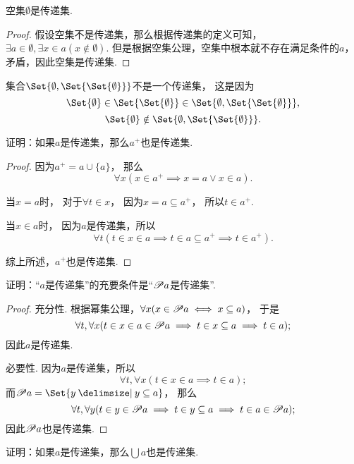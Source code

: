 \begin{example}
空集\(\emptyset\)是传递集.
\begin{proof}
假设空集不是传递集，那么根据传递集的定义可知，\(\exists a \in \emptyset, \exists x \in a (x \notin \emptyset)\).
但是根据空集公理，空集中根本就不存在满足条件的\(a\)，矛盾，因此空集是传递集.
\end{proof}
\end{example}

\begin{example}
\def\a{\Set{\emptyset}}%
\def\b{\Set{\a}}%
\def\A{\Set{ \emptyset, \b }}%
集合\(\A\)不是一个传递集，%
这是因为\[
\a \in \b \in \A,
\]\[
\a \notin \A.
\]
\end{example}

\begin{example}
证明：如果\(a\)是传递集，那么\(a^+\)也是传递集.
\begin{proof}
因为\(a^+ = a \cup \{a\}\)，%
那么\[
\forall x( x \in a^+ \implies x = a \lor x \in a ).
\]

当\(x = a\)时，%
对于\(\forall t \in x\)，%
因为\(x = a \subseteq a^+\)，%
所以\(t \in a^+\).

当\(x \in a\)时，%
因为\(a\)是传递集，所以\[
\forall t
(
t \in x \in a
\implies t \in a \subseteq a^+
\implies t \in a^+
).
\]

综上所述，\(a^+\)也是传递集.
\end{proof}
\end{example}

\begin{example}
证明：“\(a\)是传递集”的充要条件是“\(\mathscr{P} a\)是传递集”.
\begin{proof}
充分性.
根据幂集公理，\(\forall x(x \in \mathscr{P} a \iff x \subseteq a)\)，%
于是\[
\forall t, \forall x
(t \in x \in a \in \mathscr{P} a
\implies t \in x \subseteq a
\implies t \in a);
\]因此\(a\)是传递集.

必要性.
因为\(a\)是传递集，所以\[
\forall t, \forall x
(t \in x \in a \implies t \in a);
\]
而\(\Powerset a = \Set{ y \given y \subseteq a }\)，%
那么\[
\forall t, \forall y
(t \in y \in \mathscr{P} a
\implies t \in y \subseteq a
\implies t \in a \in \mathscr{P} a);
\]
因此\(\mathscr{P} a\)也是传递集.
\end{proof}
\end{example}

\begin{example}
证明：如果\(a\)是传递集，那么\(\bigcup a\)也是传递集.
\end{example}


